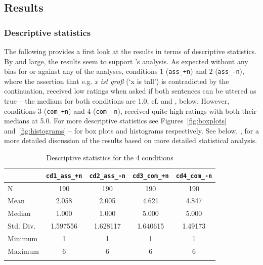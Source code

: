 \documentclass[output=paper
,modfonts
,nonflat]{langsci/langscibook}
\begin{document}
\subsection{Results}

\subsubsection{Descriptive statistics}

The following provides a first look at the results in terms of descriptive statistics. By and large, the results seem to support \citeauthor{umbach2009a_comp}'s \citeyearpar{umbach2009a_comp} analysis. As expected without any bias for or against any of the analyses, conditions $1$ (\texttt{ass\_+n}) and $2$ (\texttt{\mbox{ass\_-n}}), where the assertion that e.g. \textit{x ist groß} (`x is tall') is contradicted by the continuation, received low ratings when asked if both sentences can be uttered as true -- the medians for both conditions are 1.0, cf.  and , below. However, conditions $3$ (\texttt{com\_+n}) and $4$ (\texttt{com\_-n}), received quite high ratings with both their medians at 5.0. For more descriptive statistics see Figures~\ref{fig:boxplots} and~\ref{fig:histograms} -- for box plots and histograms respectively. See below, , for a more detailed discussion of the results based on more detailed statistical analysis.

\begin{table}
\caption{Descriptive statistics for the 4 conditions}
\label{tab:descriptive_stats}
 \begin{tabular}{lSSSS} 
  \lsptoprule
	   & \texttt{cd1\_ass\_+n}	& \texttt{cd2\_ass\_-n}	& \texttt{cd3\_com\_+n}	& \texttt{cd4\_com\_-n}	\\ 
  \midrule
	N	        & 190		& 190		& 190		& 190		\\
	Mean	    & 2.058		& 2.005		& 4.621		& 4.847		\\
	Median	    & 1.000		& 1.000		& 5.000		& 5.000		\\
    Std. Div.	& 1.597556	& 1.628117	& 1.640615	& 1.49173	\\
	Minimum		& 1 		& 1 		& 1		    & 1		    \\
	Maximum		& 6	    	& 6	    	& 6		    & 6		    \\
  \lspbottomrule
 \end{tabular}
\end{table}
\end{document}
